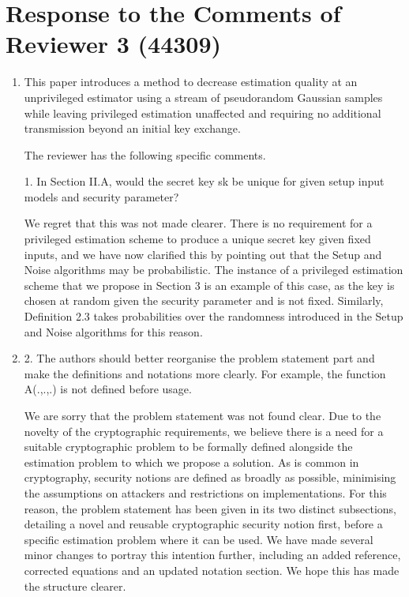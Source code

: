 \documentclass[a4paper]{scrartcl}
\newenvironment{rebuttal}{\begin{enumerate}[label={\color{grey}\thesection.\arabic{enumi}},leftmargin=0pt,ref=\thesection.\arabic{enumi}]}{\end{enumerate}}
\newcommand{\reviewtext}[1]{{\color{nblue} #1}}
\begin{document}
\section*{Response to the Comments of Reviewer 3 (44309)}
\def\thesection{R3}
\begin{rebuttal}
\item \reviewtext{This paper introduces a method to decrease estimation quality at an unprivileged estimator using a stream of pseudorandom Gaussian samples while leaving privileged estimation unaffected and requiring no additional transmission beyond an initial key exchange.

The reviewer has the following specific comments.

1. In Section II.A, would the secret key sk be unique for given setup input models and security parameter?}

We regret that this was not made clearer. There is no requirement for a privileged estimation scheme to produce a unique secret key given fixed inputs, and we have now clarified this by pointing out that the Setup and Noise algorithms may be probabilistic. The instance of a privileged estimation scheme that we propose in Section 3 is an example of this case, as the key is chosen at random given the security parameter and is not fixed. Similarly, Definition 2.3 takes probabilities over the randomness introduced in the Setup and Noise algorithms for this reason.

\item \reviewtext{2. The authors should better reorganise the problem statement part and make the definitions and notations more clearly. For example, the function A(.,.,.) is not defined before usage.}

We are sorry that the problem statement was not found clear. Due to the novelty of the cryptographic requirements, we believe there is a need for a suitable cryptographic problem to be formally defined alongside the estimation problem to which we propose a solution. As is common in cryptography, security notions are defined as broadly as possible, minimising the assumptions on attackers and restrictions on implementations. For this reason, the problem statement has been given in its two distinct subsections, detailing a novel and reusable cryptographic security notion first, before a specific estimation problem where it can be used. We have made several minor changes to portray this intention further, including an added reference, corrected equations and an updated notation section. We hope this has made the structure clearer.


\end{rebuttal}
\end{document}

